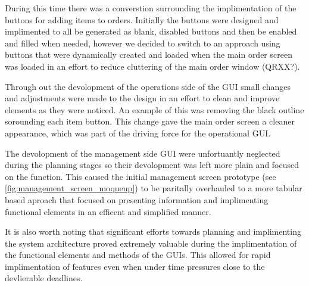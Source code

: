 During this time there was a converstion surrounding the implimentation of the buttons for adding items to orders. Initially the buttons were designed and implimented to all be generated as blank, disabled buttons and then be enabled and filled when needed, however we decided to switch to an approach using buttons that were dynamically created and loaded when the main order screen was loaded in an effort to reduce cluttering of the main order window (QRXX?).

Through out the devolopment of the operations side of the GUI small changes and adjustments were made to the design in an effort to clean and improve elements as they were noticed. An example of this was removing the black outline sorounding each item button. This change gave the main order screen a cleaner appearance, which was part of the driving force for the operational GUI.

The devolopment of the management side GUI were unfortuantly neglected during the planning stages so their devolopment was left more plain and focused on the function. This caused the initial management screen prototype (see \ref{fig:management_screen_moqueup}) to be paritally overhauled to a more tabular based aproach that focused on presenting information and implimenting functional elements in an efficent and simplified manner.

It is also worth noting that significant efforts towards planning and implimenting the system architecture proved extremely valuable during the implimentation of the functional elements and methods of the GUIs. This allowed for rapid implimentation of features even when under time pressures close to the devlierable deadlines. 

